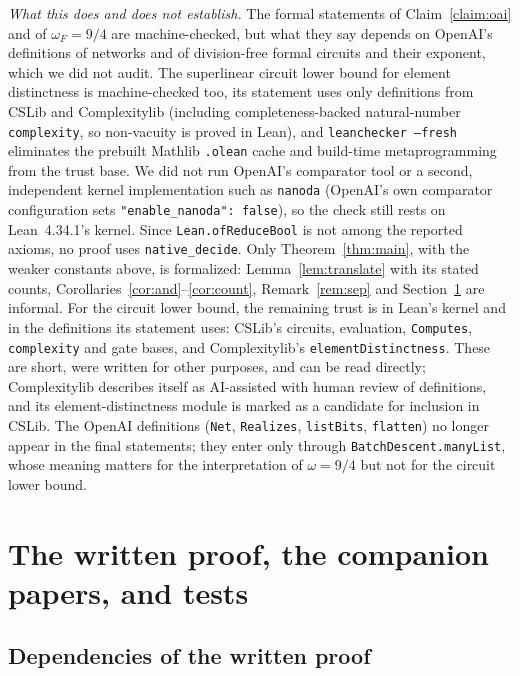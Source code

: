 \documentclass[11pt]{article}
\theoremstyle{definition}
\begin{document}
\emph{What this does and does not establish.} The formal statements of Claim~\ref{claim:oai} and of $\omega_F=9/4$ are machine-checked, but what they say depends on OpenAI's definitions of networks and of division-free formal circuits and their exponent, which we did not audit. The superlinear circuit lower bound for element distinctness is machine-checked too, its statement uses only definitions from CSLib and Complexitylib (including completeness-backed natural-number \texttt{complexity}, so non-vacuity is proved in Lean), and \texttt{leanchecker --fresh} eliminates the prebuilt Mathlib \texttt{.olean} cache and build-time metaprogramming from the trust base. We did not run OpenAI's comparator tool or a second, independent kernel implementation such as \texttt{nanoda} (OpenAI's own  comparator configuration sets \texttt{"enable\_nanoda": false}), so the check still rests on Lean~4.34.1's kernel. Since \texttt{Lean.ofReduceBool} is not among the reported axioms, no proof uses \texttt{native\_decide}. Only Theorem~\ref{thm:main}, with the weaker constants above, is formalized: Lemma~\ref{lem:translate} with its stated counts, Corollaries~\ref{cor:and}--\ref{cor:count}, Remark~\ref{rem:sep} and Section~\ref{sec:discussion} are informal. For the circuit lower bound, the remaining trust is in Lean's kernel and in the definitions its statement uses: CSLib's circuits, evaluation, \texttt{Computes}, \texttt{complexity} and gate bases, and Complexitylib's \texttt{elementDistinctness}. These are short, were written for other purposes, and can be read directly; Complexitylib describes itself as AI-assisted with human review of definitions, and its element-distinctness module is marked as a candidate for inclusion in CSLib. The OpenAI definitions (\texttt{Net}, \texttt{Realizes}, \texttt{listBits}, \texttt{flatten}) no longer appear in the final statements; they enter only through \texttt{BatchDescent.manyList}, whose meaning matters for the interpretation of $\omega=9/4$ but not for the circuit lower bound.

\section{The written proof, the companion papers, and tests}\label{sec:discussion}

\subsection{Dependencies of the written proof}
\end{document}
